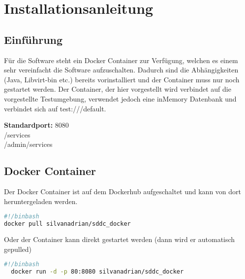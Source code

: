 \chapter{Installationsanleitung}
\section{Einführung}
Für die Software steht ein Docker Container zur Verfügung, welchen es einem sehr 
vereinfacht die Software aufzuschalten.
Dadurch sind die Abhängigkeiten (Java, Libvirt-bin etc.) bereits vorinstalliert 
und der Container muss nur noch gestartet werden.
Der Container, der hier vorgestellt wird verbindet auf die vorgestellte 
Testumgebung, verwendet jedoch eine inMemory Datenbank und verbindet sich auf 
test:///default.

\textbf{Standardport:} 8080
\\
 /services
\\
 /admin/services

\section{Docker Container}
Der Docker Container ist auf dem Dockerhub aufgeschaltet und kann von dort 
heruntergeladen werden.
\begin{lstlisting}[style=BASH,language=bash,caption={Pull Docker Container}]
#!/binbash
docker pull silvanadrian/sddc_docker
\end{lstlisting}
Oder der Container kann direkt gestartet werden (dann wird er automatisch gepulled)

\begin{lstlisting}[style=Bash,language=bash,caption={Run Docker Container}]
  #!/binbash
  docker run -d -p 80:8080 silvanadrian/sddc_docker
\end{lstlisting}